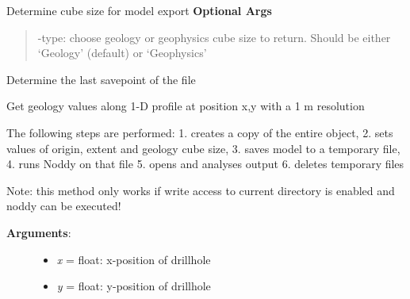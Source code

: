\documentclass[a4paper,10pt,english]{sphinxmanual}
\begin{document}
\begin{fulllineitems}
\begin{fulllineitems}
\end{fulllineitems}


\begin{fulllineitems}
\label{pynoddy:pynoddy.history.NoddyHistory.get_cube_size}
Determine cube size for model export
\textbf{Optional Args}
\begin{quote}

-type: choose geology or geophysics cube size to return. Should be either `Geology' (default) or `Geophysics'
\end{quote}

\end{fulllineitems}


\begin{fulllineitems}
\label{pynoddy:pynoddy.history.NoddyHistory.get_date_saved}
Determine the last savepoint of the file

\end{fulllineitems}


\begin{fulllineitems}
\label{pynoddy:pynoddy.history.NoddyHistory.get_drillhole_data}
Get geology values along 1-D profile at position x,y with a 1 m resolution

The following steps are performed:
1. creates a copy of the entire object,
2. sets values of origin, extent and geology cube size, 
3. saves model to a temporary file, 
4. runs Noddy on that file
5. opens and analyses output
6. deletes temporary files

Note: this method only works if write access to current directory
is enabled and noddy can be executed!
\begin{description}
\item[{\textbf{Arguments}:}] \leavevmode\begin{itemize}
\item {} 
\emph{x} = float: x-position of drillhole

\item {} 
\emph{y} = float: y-position of drillhole


\end{itemize}
\end{description}
\end{fulllineitems}
\end{fulllineitems}
\end{document}
